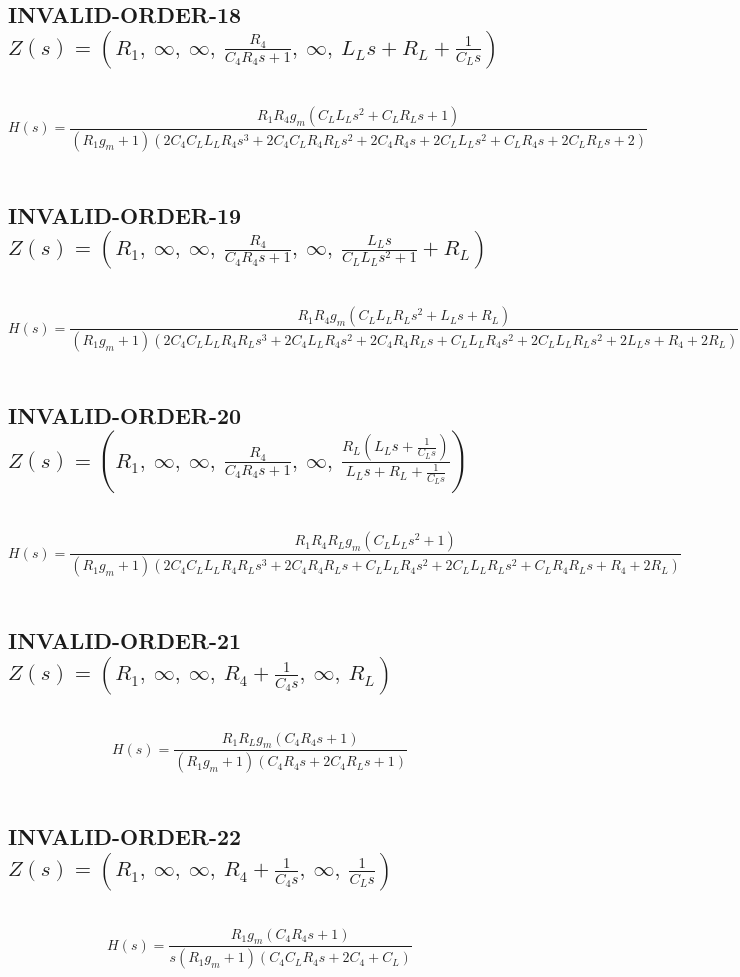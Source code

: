 \documentclass{article}
\begin{document}
\subsection{INVALID-ORDER-18 $Z(s) = \left( R_{1}, \  \infty, \  \infty, \  \frac{R_{4}}{C_{4} R_{4} s + 1}, \  \infty, \  L_{L} s + R_{L} + \frac{1}{C_{L} s}\right)$ } \ 
\textbf{\[H(s) = \frac{R_{1} R_{4} g_{m} \left(C_{L} L_{L} s^{2} + C_{L} R_{L} s + 1\right)}{\left(R_{1} g_{m} + 1\right) \left(2 C_{4} C_{L} L_{L} R_{4} s^{3} + 2 C_{4} C_{L} R_{4} R_{L} s^{2} + 2 C_{4} R_{4} s + 2 C_{L} L_{L} s^{2} + C_{L} R_{4} s + 2 C_{L} R_{L} s + 2\right)}\] } \ 
\subsection{INVALID-ORDER-19 $Z(s) = \left( R_{1}, \  \infty, \  \infty, \  \frac{R_{4}}{C_{4} R_{4} s + 1}, \  \infty, \  \frac{L_{L} s}{C_{L} L_{L} s^{2} + 1} + R_{L}\right)$ } \ 
\textbf{\[H(s) = \frac{R_{1} R_{4} g_{m} \left(C_{L} L_{L} R_{L} s^{2} + L_{L} s + R_{L}\right)}{\left(R_{1} g_{m} + 1\right) \left(2 C_{4} C_{L} L_{L} R_{4} R_{L} s^{3} + 2 C_{4} L_{L} R_{4} s^{2} + 2 C_{4} R_{4} R_{L} s + C_{L} L_{L} R_{4} s^{2} + 2 C_{L} L_{L} R_{L} s^{2} + 2 L_{L} s + R_{4} + 2 R_{L}\right)}\] } \ 
\subsection{INVALID-ORDER-20 $Z(s) = \left( R_{1}, \  \infty, \  \infty, \  \frac{R_{4}}{C_{4} R_{4} s + 1}, \  \infty, \  \frac{R_{L} \left(L_{L} s + \frac{1}{C_{L} s}\right)}{L_{L} s + R_{L} + \frac{1}{C_{L} s}}\right)$ } \ 
\textbf{\[H(s) = \frac{R_{1} R_{4} R_{L} g_{m} \left(C_{L} L_{L} s^{2} + 1\right)}{\left(R_{1} g_{m} + 1\right) \left(2 C_{4} C_{L} L_{L} R_{4} R_{L} s^{3} + 2 C_{4} R_{4} R_{L} s + C_{L} L_{L} R_{4} s^{2} + 2 C_{L} L_{L} R_{L} s^{2} + C_{L} R_{4} R_{L} s + R_{4} + 2 R_{L}\right)}\] } \ 
\subsection{INVALID-ORDER-21 $Z(s) = \left( R_{1}, \  \infty, \  \infty, \  R_{4} + \frac{1}{C_{4} s}, \  \infty, \  R_{L}\right)$ } \ 
\textbf{\[H(s) = \frac{R_{1} R_{L} g_{m} \left(C_{4} R_{4} s + 1\right)}{\left(R_{1} g_{m} + 1\right) \left(C_{4} R_{4} s + 2 C_{4} R_{L} s + 1\right)}\] } \ 
\subsection{INVALID-ORDER-22 $Z(s) = \left( R_{1}, \  \infty, \  \infty, \  R_{4} + \frac{1}{C_{4} s}, \  \infty, \  \frac{1}{C_{L} s}\right)$ } \ 
\textbf{\[H(s) = \frac{R_{1} g_{m} \left(C_{4} R_{4} s + 1\right)}{s \left(R_{1} g_{m} + 1\right) \left(C_{4} C_{L} R_{4} s + 2 C_{4} + C_{L}\right)}\] } \ 
\end{document}
